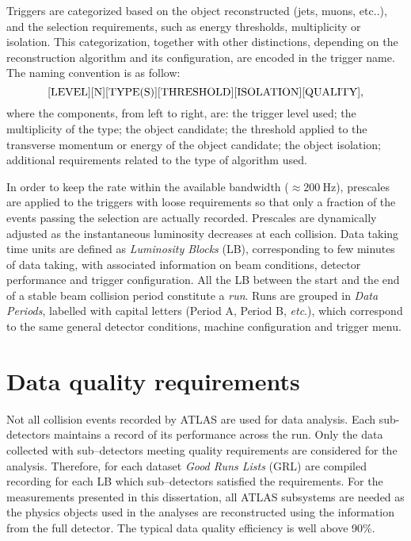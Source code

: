 Triggers are categorized based on the object reconstructed (jets,
muons, etc..), and the selection requirements, such as energy
thresholds, multiplicity or isolation. This categorization, together
with other distinctions, depending on the reconstruction algorithm and
its configuration, are encoded in the trigger name.
The naming convention is as follow:
\begin{equation*}\label{eq:}
{\rm [LEVEL][N][TYPE(S)][THRESHOLD][ISOLATION][QUALITY]},
\end{equation*}
where the components, from left to right, are: the trigger level used; the
multiplicity of the type; the object candidate; the threshold applied to
the transverse momentum or energy of the object candidate; the object isolation;
additional requirements related to the type of algorithm used.

In order to keep the rate within the available bandwidth
($\approx{}200~\mathrm{Hz}$),  prescales are applied to the triggers
with loose requirements so that only a fraction of the events passing
the selection are actually recorded.
Prescales are dynamically adjusted as the instantaneous luminosity
decreases at each collision. Data taking time units are defined as
{\it Luminosity Blocks} (LB), corresponding to few minutes of  data
taking, with associated information on beam conditions, detector performance 
and trigger configuration. All the LB between the start and the
end of a stable beam collision period constitute a {\it run}. Runs are grouped
in {\it Data Periods}, labelled with capital letters (Period A, Period B, {\it etc}.),
which correspond to the same general detector conditions, machine configuration and
trigger menu.

\section{Data quality requirements}
\label{sec:daq}

Not all collision events recorded by ATLAS are used for data analysis.
Each sub-detectors maintains a record of its performance across the
run. Only the data collected with sub--detectors meeting quality
requirements are considered for the analysis. Therefore, for each dataset
{\it Good Runs Lists} (GRL) are compiled recording for each LB which
sub--detectors satisfied the requirements.
For the measurements presented in this dissertation, all ATLAS subsystems
are needed as the physics objects used in the analyses are reconstructed
using the information from the full detector. The typical data quality
efficiency is well above 90\%.

